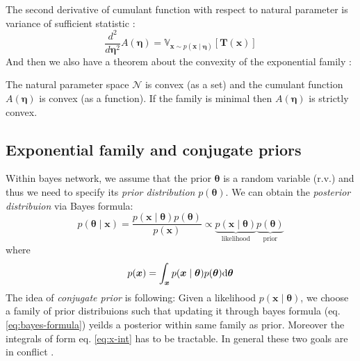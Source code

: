 The second derivative of cumulant function with respect to natural parameter is variance of sufficient statistic \cite{exp-family-jorden-2009}:
$$
\frac{d^2}{d \boldsymbol{\eta}^2} A(\boldsymbol{\eta}) = \mathbb{V}_{\boldsymbol{x} \sim p(\boldsymbol{x}\mid \boldsymbol{\eta})} [\boldsymbol{T}(\boldsymbol{x})]
$$
And then we also have a theorem about the convexity of the exponential family \cite{exp-family-jorden-2009}:
\begin{theorem}
The natural parameter space $\mathcal{N}$ is convex (as a set) and the cumulant function $A(\boldsymbol{\eta})$ is convex (as a function). 
If the family is minimal then $A(\boldsymbol{\eta})$ is strictly convex.
\end{theorem}
\subsection*{Exponential family and conjugate priors}
Within bayes network, we assume that the prior $\boldsymbol{\theta}$ is a random variable (r.v.) and thus we need to specify its \textit{prior distribution} $p(\boldsymbol{\theta})$.
We can obtain the \textit{posterior distribuion} via Bayes formula:
\begin{equation}
    p(\boldsymbol{\theta} \mid \boldsymbol{x}) = \frac{p( \boldsymbol{x} \mid \boldsymbol{\theta}) p(\boldsymbol{\theta})}{p(\boldsymbol{x})} \propto \underbrace{p( \boldsymbol{x} \mid \boldsymbol{\theta})}_{\text{likelihood}} \underbrace{p(\boldsymbol{\theta})}_{\text{prior}}
    \label{eq:bayes-formula}
\end{equation}
where 
\begin{equation}
    p(\boldsymbol{x}) = \int_{\boldsymbol{x}} p( \boldsymbol{x} \mid \boldsymbol{\theta}) p(\boldsymbol{\theta}) \mbox{\rm d}\boldsymbol{\theta} \label{eq:x-int}
\end{equation}
The idea of  \textit{conjugate prior} is following: Given a likelihood $p( \boldsymbol{x} \mid \boldsymbol{\theta})$, we choose a family of prior distribuions such that updating it through 
bayes formula (eq. \ref{eq:bayes-formula}) yeilds a posterior within same family as prior. Moreover the integrals of form eq. \ref{eq:x-int} has to be tractable. In general these two goals
are in conflict \cite{conjugates-jorden-2009}. 

